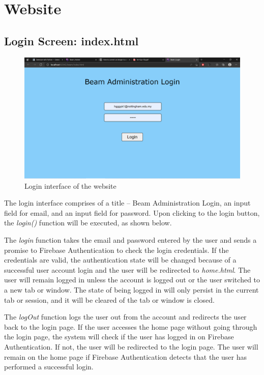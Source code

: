 \documentclass[../report.tex]{subfiles}
\begin{document}
\section{Website}
\subsection{Login Screen: index.html}
\begin{figure}[H]
	\centering
	\includegraphics[width=.7\linewidth]{../images/07/01-01-login.png}
	\caption{Login interface of the website}
	\label{fig:07-01-01-login}
\end{figure}

The login interface comprises of a title -- Beam Administration Login, an input field for email, and an input field for password. Upon clicking to the login button, the \textit{login()} function will be executed, as shown below.



The \textit{login} function takes the email and password entered by the user and sends a promise to Firebase Authentication to check the login credentials. If the credentials are valid, the authentication state will be changed because of a successful user account login and the user will be redirected to \textit{home.html}. The user will remain logged in unless the account is logged out or the user switched to a new tab or window. The state of being logged in will only persist in the current tab or session, and it will be cleared of the tab or window is closed. 



The \textit{logOut} function logs the user out from the account and redirects the user back to the login page. If the user accesses the home page without going through the login page, the system will check if the user has logged in on Firebase Authentication. If not, the user will be redirected to the login page. The user will remain on the home page if Firebase Authentication detects that the user has performed a successful login.
\end{document}
